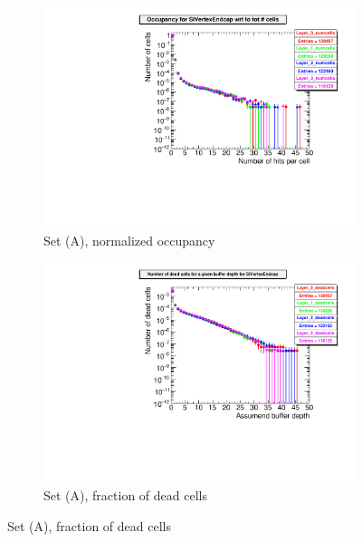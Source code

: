 \begin{figure}[!htbp]
\begin{subfigure}[b]{0.49\textwidth}
   \centering
    \includegraphics[width=\textwidth]{Figures/Pairs/Appendix/occupancy_numcells_SiVertexEndcap_ILC250_SetA.pdf}
   \caption{Set (A), normalized occupancy}
   \end{subfigure}
   \hfill
    \begin{subfigure}[b]{0.49\textwidth}
   \centering
    \includegraphics[width=\textwidth]{Figures/Pairs/Appendix/occupancy_deadcells_SiVertexEndcap_ILC250_SetA.pdf}
   \caption{Set (A), fraction of dead cells}
   \end{subfigure}
  \end{figure}

